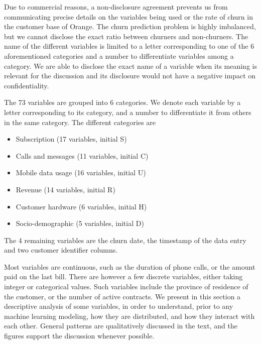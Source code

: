 Due to commercial reasons, a non-disclosure agreement prevents us from
communicating precise details on the variables being used or the rate of churn
in the customer base of Orange. The churn prediction problem is highly
imbalanced, but we cannot disclose the exact ratio between churners and
non-churners. The name of the different variables is limited to a letter
corresponding to one of the 6 aforementioned categories and a number to
differentiate variables among a category. We are able to disclose the exact name
of a variable when its meaning is relevant for the discussion and its disclosure
would not have a negative impact on confidentiality.

The 73 variables are grouped into 6 categories. We denote each variable by a
letter corresponding to its category, and a number to differentiate it from
others in the same category. The different categories are

\begin{itemize}
    \item Subscription (17 variables, initial S)
    \item Calls and messages (11 variables, initial C)
    \item Mobile data usage (16 variables, initial U)
    \item Revenue (14 variables, initial R)
    \item Customer hardware (6 variables, initial H)
    \item Socio-demographic (5 variables, initial D)
\end{itemize}
The 4 remaining variables are the churn date, the timestamp of the data entry and
two customer identifier columns.

Most variables are continuous, such as the duration of phone calls, or the
amount paid on the last bill. There are however a few discrete variables, either
taking integer or categorical values. Such variables include the province of
residence of the customer, or the number of active contracts. We present in this
section a descriptive analysis of some variables, in order to understand, prior
to any machine learning modeling, how they are distributed, and how they
interact with each other. General patterns are qualitatively discussed in the
text, and the figures support the discussion whenever possible.

